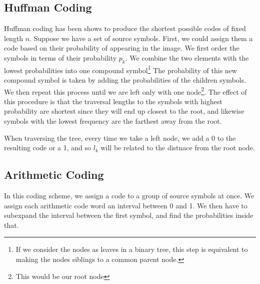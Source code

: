 \documentclass{tufte-handout}
\begin{document}
\subsection{Huffman Coding}
Huffman coding has been shows to produce the shortest possible codes of fixed length
$n$. Suppose we have a set of source symbols. First, we could assign them a code 
based on their probability of appearing in the image. We first order the symbols in 
terms of their probability $p_{k}$. We combine the two elements with the lowest 
probabilities into one compound symbol\footnote{If we consider the nodes as leaves 
in a binary tree, this step is equivalent to making the nodes siblings to a common 
parent node.} The probability of this new compound symbol is taken by adding the 
probabilities of the children symbols. We then repeat this process until we are 
left only with one node\footnote{This would be our root node}. The effect of this
procedure is that the traversal lengths to the symbols with highest probability are 
shortest since they will end up closest to the root, and likewise symbols with the 
lowest frequency are the farthest away from the root. 

When traversing the tree, every time we take a left node, we add a 0 to the 
resulting code or a 1, and so $l_{k}$ will be related to the distnace from the root 
node.

\subsection{Arithmetic Coding}
In this coding scheme, we assign a code to a group of source symbols at once. We assign
each arithmetic code word an interval between 0 and 1. We then have to subexpand the 
interval between the first symbol, and find the probabilities inside that.
\end{document}
